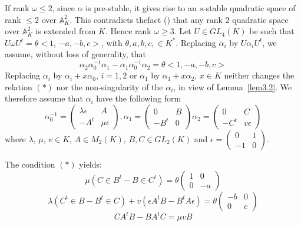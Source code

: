 \begin{Proof}
If rank $\omega \leq 2$, since $\alpha$ is pre-stable, it gives rise
to an $s$-stable quadratic space of rank $\leq 2$ over
$\mathbb{A}^{2}_K$. This contradicts the\pageoriginale fact (\cite[Proposition 1.1]{key9}) that any rank $2$ quadratic space over $\mathbb{A}^{2}_K$ is extended from $K$. Hence rank $\omega \geq 3$. Let $U\in GL_4(K)$ be such that $U\omega U^{t}=\theta <1$, $-a, -b, c>$, with $\theta, a, b, c, \in K^{\ast}$. Replacing $\alpha_i$ by $U\alpha_i U^{t}$, we assume, without loss of generality, that 
\begin{equation*}
\alpha_2\alpha^{-1}_0\alpha_1-\alpha_1\alpha^{-1}_0\alpha_2=\theta <1, -a, -b, c>\tag{$\ast$}
\end{equation*}
Replacing $\alpha_i$ by $\alpha_i+x\alpha_0$, $i=1,2$ or $\alpha_1$ by $\alpha_1+x\alpha_2$, $x\in K$ neither changes the relation $(\ast)$ nor the non-singularity of the $\alpha_i$, in view of Lemma~\ref{lem3.2}. We therefore assume that $\alpha_i$ have the following form 
$$
\alpha^{-1}_0=
\begin{pmatrix}
\lambda \epsilon & A\\
-A^{t}& \mu \epsilon
\end{pmatrix},
\alpha_1=
\begin{pmatrix}
0 & B\\
-B^{t} & 0
\end{pmatrix} 
\alpha_2=
\begin{pmatrix}
0 & C\\
-C^{t} & v \epsilon
\end{pmatrix}
$$
where $\lambda$, $\mu$, $v\in K$, $A\in M_2(K)$, $B, C\in GL_2(K)$ and $\epsilon=\begin{pmatrix}
0 & 1\\
-1 & 0
\end{pmatrix}$.

The condition $(\ast)$ yields: 
\begin{equation}\label{eqn1}
\mu(C\in B^{t}-B\in C^{t})=\theta \begin{pmatrix}
1 & 0\\
0 & -a
\end{pmatrix}
\end{equation}
\begin{equation}\label{eqn2}
\lambda\left(C^{t}\in B-B^{t}\in C\right)+v\left(\epsilon A^{t}B-B^{t}A\epsilon\right)=\theta \begin{pmatrix}
-b & 0\\
0 & c
\end{pmatrix}
\end{equation}
\begin{equation}\label{eqn3}
CA^{t}B-BA^{t}C=\mu v B
\end{equation}


\end{Proof}
